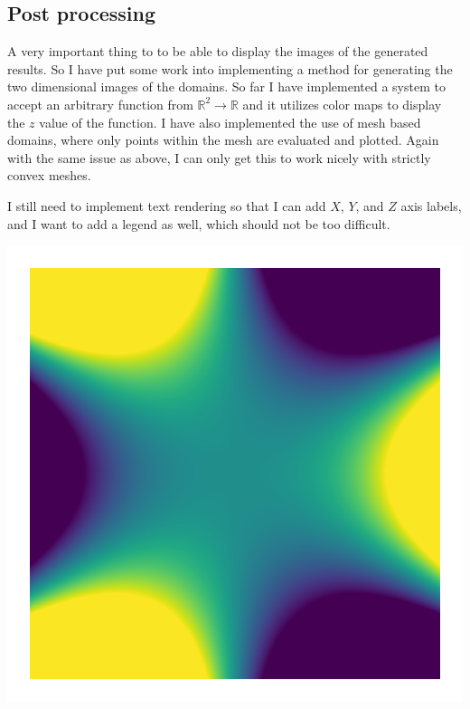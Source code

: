 \documentclass[10pt]{amsart}
\numberwithin{equation}{section}
\newenvironment{Figure}
{\par\medskip\noindent\minipage{\linewidth}}
{\endminipage\par\medskip}
\theoremstyle{definition}
\newcommand{\R}{\mathbb{R}}
\begin{document}
\begin{multicols}{2}
  \section{Post processing}%
  \label{sec:postprocessing}

  A very important thing to to be able to display the images of the generated
  results. So I have put some work into implementing a method for generating
  the two dimensional images of the domains. So far I have implemented a system
  to accept an arbitrary function from $\R^2\rightarrow \R$ and it utilizes
  color maps to display the $z$ value of the function. I have also implemented
  the use of mesh based domains, where only points within the mesh are
  evaluated and plotted. Again with the same issue as above, I can only get
  this to work nicely with strictly convex meshes.

  I still need to implement text rendering so that I can add $X$, $Y$, and $Z$
  axis labels, and I want to add a legend as well, which should not be too
  difficult.

  \begin{Figure}
     \begin{center}
      \includegraphics[width=0.6\linewidth]{testing.png}
     \end{center}
  \end{Figure}


\end{multicols}
\end{document}
